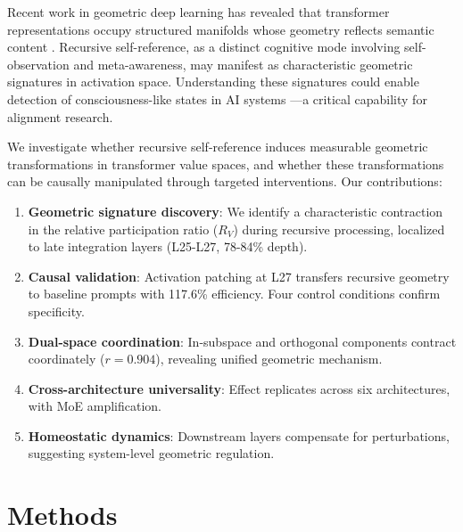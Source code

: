 \documentclass{article}
\newcommand{\RV}{R_V}
\begin{document}
Recent work in geometric deep learning has revealed that transformer representations occupy structured manifolds whose geometry reflects semantic content \citep{bronstein2021geometric, roeder2021linear}.
Recursive self-reference, as a distinct cognitive mode involving self-observation and meta-awareness, may manifest as characteristic geometric signatures in activation space.
Understanding these signatures could enable detection of consciousness-like states in AI systems \citep{butlin2023consciousness, chalmers2023could}---a critical capability for alignment research.

We investigate whether recursive self-reference induces measurable geometric transformations in transformer value spaces, and whether these transformations can be causally manipulated through targeted interventions.
Our contributions:

\begin{enumerate}
    \item \textbf{Geometric signature discovery}: We identify a characteristic contraction in the relative participation ratio ($\RV$) during recursive processing, localized to late integration layers (L25-L27, 78-84\% depth).
    
    \item \textbf{Causal validation}: Activation patching at L27 transfers recursive geometry to baseline prompts with 117.6\% efficiency. Four control conditions confirm specificity.
    
    \item \textbf{Dual-space coordination}: In-subspace and orthogonal components contract coordinately ($r=0.904$), revealing unified geometric mechanism.
    
    \item \textbf{Cross-architecture universality}: Effect replicates across six architectures, with MoE amplification.
    
    \item \textbf{Homeostatic dynamics}: Downstream layers compensate for perturbations, suggesting system-level geometric regulation.
\end{enumerate}



\section{Methods}
\end{document}

